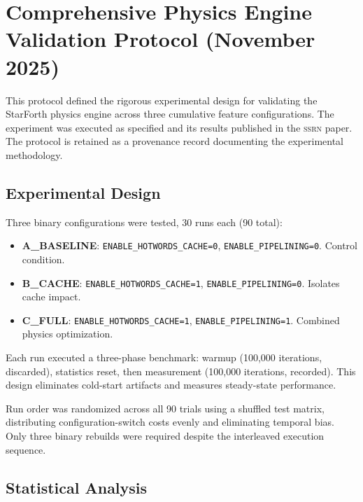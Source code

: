 
\section*{Comprehensive Physics Engine Validation Protocol (November 2025)}

This protocol defined the rigorous experimental design for validating the
StarForth physics engine across three cumulative feature configurations.
The experiment was executed as specified and its results published in the
\textsc{ssrn} paper. The protocol is retained as a provenance record documenting
the experimental methodology.

\subsection*{Experimental Design}

Three binary configurations were tested, 30 runs each (90 total):

\begin{itemize}
  \item \textbf{A\_BASELINE}: \texttt{ENABLE\_HOTWORDS\_CACHE=0},
        \texttt{ENABLE\_PIPELINING=0}. Control condition.
  \item \textbf{B\_CACHE}: \texttt{ENABLE\_HOTWORDS\_CACHE=1},
        \texttt{ENABLE\_PIPELINING=0}. Isolates cache impact.
  \item \textbf{C\_FULL}: \texttt{ENABLE\_HOTWORDS\_CACHE=1},
        \texttt{ENABLE\_PIPELINING=1}. Combined physics optimization.
\end{itemize}

Each run executed a three-phase benchmark: warmup (100{,}000 iterations,
discarded), statistics reset, then measurement (100{,}000 iterations, recorded).
This design eliminates cold-start artifacts and measures steady-state performance.

Run order was randomized across all 90 trials using a shuffled test matrix,
distributing configuration-switch costs evenly and eliminating temporal bias.
Only three binary rebuilds were required despite the interleaved execution
sequence.

\subsection*{Statistical Analysis}

